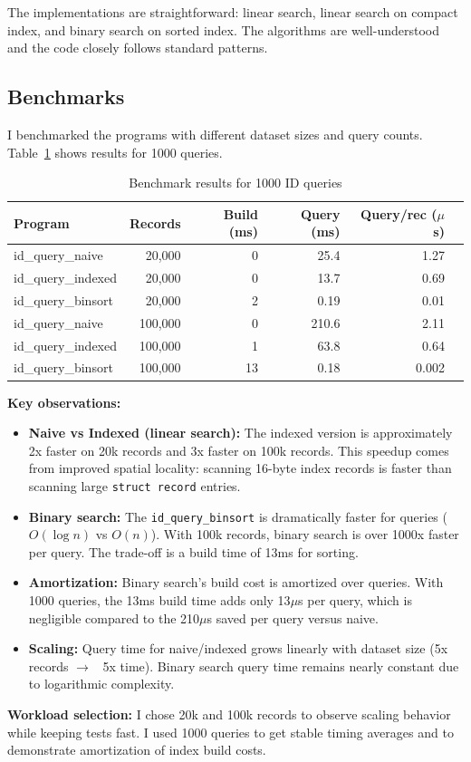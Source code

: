 \documentclass[a4paper,11pt]{article}
\begin{document}
The implementations are straightforward: linear search, linear search on compact index, and binary search on sorted index. The algorithms are well-understood and the code closely follows standard patterns.

\subsection{Benchmarks}

I benchmarked the programs with different dataset sizes and query counts. Table~\ref{tab:benchmarks} shows results for 1000 queries.

\begin{table}[h]
\centering
\begin{tabular}{lrrrrr}
\toprule
Program & Records & Build (ms) & Query (ms) & Query/rec ($\mu$s) \\
\midrule
id\_query\_naive & 20,000 & 0 & 25.4 & 1.27 \\
id\_query\_indexed & 20,000 & 0 & 13.7 & 0.69 \\
id\_query\_binsort & 20,000 & 2 & 0.19 & 0.01 \\
\midrule
id\_query\_naive & 100,000 & 0 & 210.6 & 2.11 \\
id\_query\_indexed & 100,000 & 1 & 63.8 & 0.64 \\
id\_query\_binsort & 100,000 & 13 & 0.18 & 0.002 \\
\bottomrule
\end{tabular}
\caption{Benchmark results for 1000 ID queries}
\label{tab:benchmarks}
\end{table}

\textbf{Key observations:}

\begin{itemize}
    \item \textbf{Naive vs Indexed (linear search):} The indexed version is approximately 2x faster on 20k records and 3x faster on 100k records. This speedup comes from improved spatial locality: scanning 16-byte index records is faster than scanning large \texttt{struct record} entries.

    \item \textbf{Binary search:} The \texttt{id\_query\_binsort} is dramatically faster for queries ($O(\log n)$ vs $O(n)$). With 100k records, binary search is over 1000x faster per query. The trade-off is a build time of 13ms for sorting.

    \item \textbf{Amortization:} Binary search's build cost is amortized over queries. With 1000 queries, the 13ms build time adds only 13$\mu$s per query, which is negligible compared to the 210$\mu$s saved per query versus naive.

    \item \textbf{Scaling:} Query time for naive/indexed grows linearly with dataset size (5x records $\rightarrow$ ~5x time). Binary search query time remains nearly constant due to logarithmic complexity.
\end{itemize}

\textbf{Workload selection:} I chose 20k and 100k records to observe scaling behavior while keeping tests fast. I used 1000 queries to get stable timing averages and to demonstrate amortization of index build costs.
\end{document}
